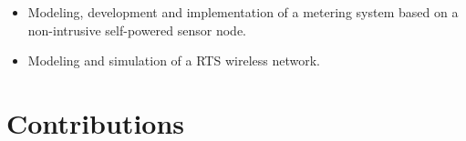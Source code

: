 
\begin{itemize}
	\setlength\itemsep{0em}
	
	\item	Modeling, development and implementation of a metering system based on a non-intrusive self-powered sensor node.

	\item Modeling and simulation of a RTS wireless network.

	
\end{itemize}

\newpage
\section{Contributions}


